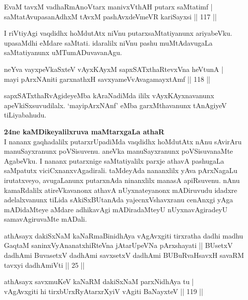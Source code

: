 \begin{shl}
EvaM tavxM vadhaRmAnoV\s tarx manivxVthAH putarx saMtatimf | \\
saMtatAvupasanAdhxM tAvxM pashAvxdeVmeVR kariSayxsi \hfill|| 117 || 
\end{shl}

\begin{artha}
I riVtiyAgi vaqdidhx hoMdutAtx niVnu putarxsaMtatiyanunx ariyabeVku. 
upasaMdhi eMdare saMtati. idaralilx niVnu pashu muMtAdavugaLa 
saMtatiyanunx uMTumADuvavanAgu.
\end{artha}


\begin{shl}
neYva vayxpeVkaSxteV vAyxKAyxM sapxSATxthaRtevxVna heVtunA | \\
mayi pArxNAniti garxnathxH savxyameVvAvagamayxtAmf \hfill|| 118 || 
\end{shl}

\begin{artha}
sapxSATxthaRvAgideyeMba kAraNadiMda ililx vAyxKAyxnavanunx 
apeVkiSxsuvudilalx. `mayipArxNAnf' eMba garxMthavanunx tAnAgiyeV
tiLiyabahudu.

\textbf{24ne kaMDikeyalilxruva maMtarxgaLa athaR}\\
I nananx gaqhadalilx putarxrUpadiMda vaqdidhx hoMdutAtx nAnu sAvirAru 
manuSayxranunx poVSisuvenu. aneVka manuSayxranunx poVSisuvanaMte 
AgabeVku. I nananx putarxnige saMtatiyalilx parxje athavA pashugaLa 
saMpatutx viciCxnanxvAgadirali. taMdeyAda nananxlilx yAva pArxNagaLu 
irutatxveyo, avugaLanunx putarxnAda ninanxlilx manasA apiRsuvenu. 
nAnu kamaRdalilx atireVkavanonx athavA nUyxnateyanonx mADiruvudu 
idadxre adelalxvanunx tiLida sAkiSxBUtanAda yajecnxVshavxranu cenAnxgi 
yAga mADidaMteye aMdare adhikavAgi mADiradaMteyU nUyxnavAgiradeyU 
samavAgiruvaMte mADali.
\end{artha}

\begin{kandikeshl}
athAsayx dakiSxNaM kaNaRmaBinidhAya vAgAvxgiti tirxratha dadhi madhu GaqtaM saninxVyAnanatxhiRteVna jAtarUpeVNa pArxshayati || BUsetxV dadhAmi BuvasetxV dadhAmi savxsetxV dadhAmi BUBuRvaHsavxH savaRM tavxyi dadhAmiVti || 25 ||
\end{kandikeshl}

\begin{shl}
athAsayx savxmuKeV kaNaRM dakiSxNaM parxNidhAya tu | \\
vAgAvxgiti hi tirxbUrxRyAtarxrXyiV vAgiti BaNayxteV \hfill|| 119 || 
\end{shl}

